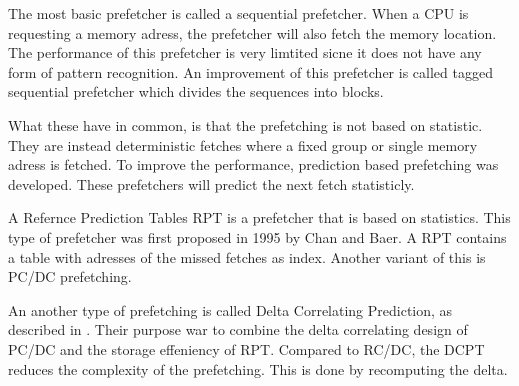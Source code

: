 The most basic prefetcher is called a sequential prefetcher. When a CPU is requesting a memory adress, the prefetcher will also fetch the memory location. The performance of this prefetcher is very limtited sicne it does not have any form of pattern recognition. An improvement of this prefetcher is called tagged sequential prefetcher which divides the sequences into blocks.

What these have in common, is that the prefetching is not based on statistic. They are instead deterministic fetches where a fixed group or single memory adress is fetched. To improve the performance, prediction based prefetching was developed. These prefetchers will predict the next fetch statisticly.   

A Refernce Prediction Tables RPT is a prefetcher that is based on statistics. This type of prefetcher was first proposed in 1995 by Chan and Baer. A RPT contains a table with adresses of the missed fetches as index. Another variant of this is PC/DC prefetching. 

An another type of prefetching is called Delta Correlating Prediction, as described in \cite{reference:jahre}. Their purpose war to combine the delta correlating design of PC/DC and the storage effeniency of RPT. Compared to RC/DC, the DCPT reduces the complexity of the prefetching. This is done by recomputing the delta. 
